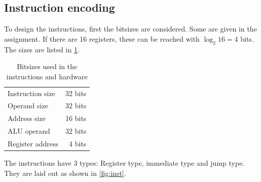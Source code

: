 \documentclass[a4paper, english]{article}
\numberwithin{equation}{section}
\begin{document}
\subsection{Instruction encoding}
To design the instructions, first the bitsizes are considered. Some are given in the assignment. If there are 16 registers, these can be reached with \(\log_2{16} = 4\) bits. The sizes are listed in \cref{tbl:bitsize}.
\begin{table}[H]
    \centering
    \caption{Bitsizes used in the instructions and hardware}\label{tbl:bitsize}
    \begin{tabular}{lr}
        \toprule
        Instruction size & 32 bits \\
        Operand size     & 32 bits \\
        Address size     & 16 bits \\
        ALU operand      & 32 bits \\
        Register address & 4 bits  \\
        \bottomrule
    \end{tabular}
\end{table}
The instructions have 3 types: Register type, immediate type and jump type. They are laid out as shown in \cref{fig:inst}.
\end{document}
